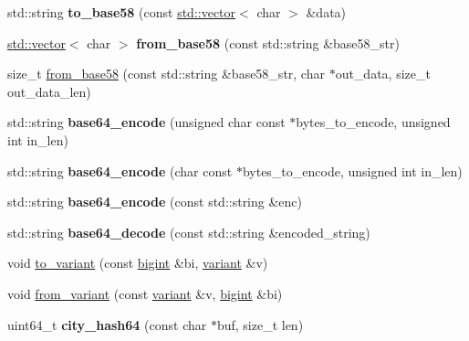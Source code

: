 \begin{DoxyCompactItemize}
\mbox{\label{namespacefc_ae3ae440d44e0f67d60cb985a336cb4ff}} 
std\+::string {\bfseries to\+\_\+base58} (const \mbox{\hyperlink{classstd_1_1vector}{std\+::vector}}$<$ char $>$ \&data)
\item 
\mbox{\label{namespacefc_ab9aa48ceb035b5fc4b0ff9e48b40bc1d}} 
\mbox{\hyperlink{classstd_1_1vector}{std\+::vector}}$<$ char $>$ {\bfseries from\+\_\+base58} (const std\+::string \&base58\+\_\+str)
\item 
size\+\_\+t \mbox{\hyperlink{namespacefc_a6f54a8adb9386444b669df3240e4f60d}{from\+\_\+base58}} (const std\+::string \&base58\+\_\+str, char $\ast$out\+\_\+data, size\+\_\+t out\+\_\+data\+\_\+len)
\item 
\mbox{\label{namespacefc_a3668095306e6c6c4c53de5d7701e4dde}} 
std\+::string {\bfseries base64\+\_\+encode} (unsigned char const $\ast$bytes\+\_\+to\+\_\+encode, unsigned int in\+\_\+len)
\item 
\mbox{\label{namespacefc_a803d5375415a7eb021f108a11639e718}} 
std\+::string {\bfseries base64\+\_\+encode} (char const $\ast$bytes\+\_\+to\+\_\+encode, unsigned int in\+\_\+len)
\item 
\mbox{\label{namespacefc_a7007f44b8d50af43e7cc0874ceaed58e}} 
std\+::string {\bfseries base64\+\_\+encode} (const std\+::string \&enc)
\item 
\mbox{\label{namespacefc_ae8deb03ba4f32aa68c5dcc62578ea2de}} 
std\+::string {\bfseries base64\+\_\+decode} (const std\+::string \&encoded\+\_\+string)
\item 
void \mbox{\hyperlink{namespacefc_a791852d6973eb602069f55baf2fc0620}{to\+\_\+variant}} (const \mbox{\hyperlink{classfc_1_1bigint}{bigint}} \&bi, \mbox{\hyperlink{classfc_1_1variant}{variant}} \&v)
\item 
void \mbox{\hyperlink{namespacefc_ae1624b29ca5721e622d9f2a0775fd07a}{from\+\_\+variant}} (const \mbox{\hyperlink{classfc_1_1variant}{variant}} \&v, \mbox{\hyperlink{classfc_1_1bigint}{bigint}} \&bi)
\item 
\mbox{\label{namespacefc_a8bc1967c65aedd6545bf78fe6ffde635}} 
uint64\+\_\+t {\bfseries city\+\_\+hash64} (const char $\ast$buf, size\+\_\+t len)

\end{DoxyCompactItemize}
